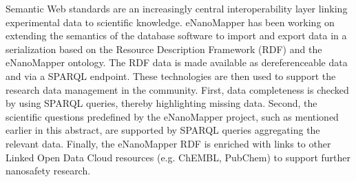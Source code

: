 \documentclass{llncs}
\begin{document}
Semantic Web standards are an increasingly central interoperability layer 
linking experimental data to scientific knowledge. eNanoMapper has been working 
on extending the semantics of the database software to import and export data in 
a serialization based on the Resource Description Framework (RDF) and the 
eNanoMapper ontology. The RDF data is made available as dereferenceable data and 
via a SPARQL endpoint. These technologies are then used to support the research 
data management in the community. First, data completeness is checked by 
using SPARQL queries, thereby highlighting missing data. Second, the scientific 
questions predefined by the eNanoMapper project, such as mentioned earlier in 
this abstract, are supported by SPARQL queries aggregating the relevant data. 
Finally, the eNanoMapper RDF is enriched with links to other Linked Open Data 
Cloud resources (e.g. ChEMBL, PubChem) to support further nanosafety research.

{}

\end{document}
